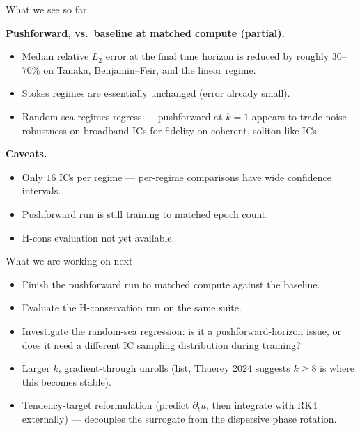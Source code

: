 \documentclass[aspectratio=169,11pt]{beamer}
\begin{document}
\begin{frame}{What we see so far}

\textbf{Pushforward, vs.\ baseline at matched compute (partial).}
\begin{itemize}
  \item Median relative $L_2$ error at the final time horizon is
        reduced by roughly $30$--$70\%$ on Tanaka, Benjamin--Feir,
        and the linear regime.
  \item Stokes regimes are essentially unchanged (error already small).
  \item \alert{Random sea regimes regress} --- pushforward at $k{=}1$
        appears to trade noise-robustness on broadband ICs for
        fidelity on coherent, soliton-like ICs.
\end{itemize}

\pause
\medskip

\textbf{Caveats.}
\begin{itemize}
  \item Only $16$ ICs per regime --- per-regime comparisons have wide
        confidence intervals.
  \item Pushforward run is still training to matched epoch count.
  \item H-cons evaluation not yet available.
\end{itemize}
\end{frame}

\begin{frame}{What we are working on next}

\begin{itemize}
  \item Finish the pushforward run to matched compute against the
        baseline.
  \item Evaluate the H-conservation run on the same suite.
  \item Investigate the random-sea regression: is it a
        pushforward-horizon issue, or does it need a different IC
        sampling distribution during training?
  \item Larger $k$, gradient-through unrolls (list, Thuerey 2024
        suggests $k\geq 8$ is where this becomes stable).
  \item Tendency-target reformulation (predict $\partial_t u$, then
        integrate with RK4 externally) --- decouples the surrogate
        from the dispersive phase rotation.
\end{itemize}
\end{frame}
\end{document}

